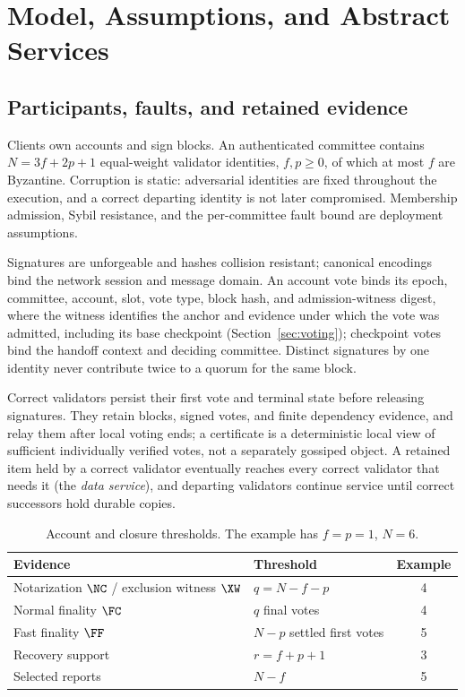 \section{Model, Assumptions, and Abstract Services}
\label{sec:model}
\subsection{Participants, faults, and retained evidence}
Clients own accounts and sign blocks. An authenticated committee contains $N=3f+2p+1$ equal-weight validator identities, $f,p\geq0$, of which at most $f$ are Byzantine. Corruption is static: adversarial identities are fixed throughout the execution, and a correct departing identity is not later compromised. Membership admission, Sybil resistance, and the per-committee fault bound are deployment assumptions.

Signatures are unforgeable and hashes collision resistant; canonical encodings bind the network session and message domain. An account vote binds its epoch, committee, account, slot, vote type, block hash, and admission-witness digest, where the witness identifies the anchor and evidence under which the vote was admitted, including its base checkpoint (Section~\ref{sec:voting}); checkpoint votes bind the handoff context and deciding committee. Distinct signatures by one identity never contribute twice to a quorum for the same block.

Correct validators persist their first vote and terminal state before releasing signatures. They retain blocks, signed votes, and finite dependency evidence, and relay them after local voting ends; a certificate is a deterministic local view of sufficient individually verified votes, not a separately gossiped object. A retained item held by a correct validator eventually reaches every correct validator that needs it (the \emph{data service}), and departing validators continue service until correct successors hold durable copies.

\begin{table}[t]
\caption{Account and closure thresholds. The example has $f=p=1$, $N=6$.}
\label{tab:thresholds}
\centering
\begin{tabularx}{\columnwidth}{@{}Ylc@{}}
\toprule
Evidence & Threshold & Example\\
\midrule
Notarization $\NC$ / exclusion witness $\XW$ & $q=N-f-p$ & 4\\
Normal finality $\FC$ & $q$ final votes & 4\\
Fast finality $\FF$ & $N-p$ settled first votes & 5\\
Recovery support & $r=f+p+1$ & 3\\
Selected reports & $N-f$ & 5\\
\bottomrule
\end{tabularx}
\end{table}

